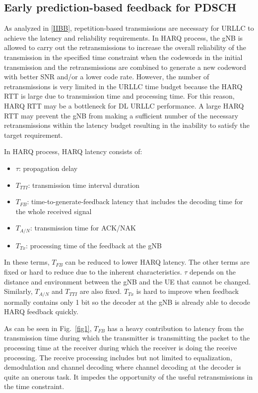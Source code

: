 \documentclass[conference]{IEEEtran}
\begin{document}
\subsection{Early prediction-based feedback for PDSCH}\label{AA}
As analyzed in \ref{IIBB}, repetition-based transmissions are necessary for URLLC to achieve the latency and reliability requirements. In HARQ process, the gNB is allowed to carry out the retransmissions to increase the overall reliability of the transmission in the specified time constraint when the codewords in the initial transmission and the retransmissions are combined to generate a new codeword with better SNR and/or a lower code rate.  However, the number of retransmissions is very limited in the URLLC time budget because the HARQ RTT is large due to transmission time and processing time. For this reason, HARQ RTT may be a bottleneck for DL URLLC performance. A large HARQ RTT may prevent the gNB from making a sufficient number of the necessary retransmissions within the latency budget resulting in the inability to satisfy the target requirement. 

In HARQ process, HARQ latency consists of:
\begin{itemize}
    \item $\tau$: propagation delay
    \item $T_{TTI}$: transmission time interval duration
    \item $T_{FB}$: time-to-generate-feedback latency that includes the decoding time for the whole received signal
    \item $T_{A/N}$: transmission time for ACK/NAK
    \item $T_{Tx}$: processing time of the feedback at the gNB
\end{itemize}

In these terms, $T_{FB}$ can be reduced to lower HARQ latency. The other terms are fixed or hard to reduce due to the inherent characteristics. $\tau$ depends on the distance and environment between the gNB and the UE that cannot be changed. Similarly, $T_{A/N}$ and $T_{TTI}$ are also fixed. $T_{Tx}$ is hard to improve when feedback normally contains only 1 bit so the decoder at the gNB is already able to decode HARQ feedback quickly. 

As can be seen in Fig.~\ref{fig1}, $T_{FB}$ has a heavy contribution to latency from the transmission time during which the transmitter is transmitting the packet to the processing time at the receiver during which the receiver is doing the receive processing. The receive processing includes but not limited to equalization, demodulation and channel decoding where channel decoding at the decoder is quite an onerous task. It impedes the opportunity of the useful retransmissions in the time constraint.
\end{document}
